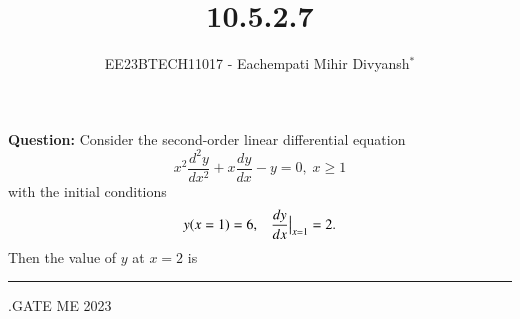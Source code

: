\documentclass[journal,12pt,twocolumn]{IEEEtran}
\theoremstyle{remark}
\begin{document}

\vspace{3cm}

\title{10.5.2.7}
\author{EE23BTECH11017 - Eachempati Mihir Divyansh$^{*}$}
\maketitle
\newpage
\bigskip

\renewcommand{\thefigure}{\theenumi}
\renewcommand{\thetable}{\theenumi}
\textbf{Question:} Consider the second-order linear differential equation
\[x^2\frac{d^2y}{dx^2}+x\frac{dy}{dx}-y=0, \; x\geq 1\]
with the initial conditions $$y(x=1)=6,\; \;\; \frac{dy}{dx}\big{|}_{x=1}=2.$$
Then the value of $y$ at $x=2$ is \rule{2cm}{0.1mm}.{\hfill{GATE ME 2023}}\\
\end{document}
